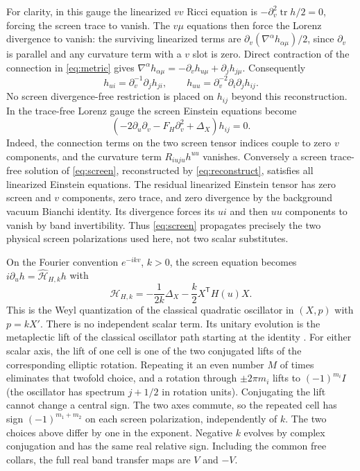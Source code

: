 \documentclass[11pt]{article}
\begin{document}
For clarity, in this gauge the linearized $vv$ Ricci equation is $-\partial_v^2 \operatorname{tr}h/2=0$, forcing the screen trace to vanish. The $v\mu$ equations then force the Lorenz divergence to vanish: the surviving linearized terms are $\partial_v(\nabla^\alpha h_{\alpha\mu})/2$, since $\partial_v$ is parallel and any curvature term with a $v$ slot is zero. Direct contraction of the connection in \eqref{eq:metric} gives
$\nabla^\alpha h_{\alpha\mu}=-\partial_v h_{u\mu}+\partial_jh_{j\mu}$.
Consequently
\begin{equation}
 h_{ui}=\partial_v^{-1}\partial_j h_{ji},\qquad
 h_{uu}=\partial_v^{-2}\partial_i\partial_j h_{ij}.
 \label{eq:reconstruct}
\end{equation}
No screen divergence-free restriction is placed on $h_{ij}$ beyond this reconstruction. In the trace-free Lorenz gauge the screen Einstein equations become
\begin{equation}
 (-2\partial_u\partial_v-F_H\partial_v^2+\Delta_X)h_{ij}=0.
 \label{eq:screen}
\end{equation}
Indeed, the connection terms on the two screen tensor indices couple to zero $v$ components, and the curvature term $R_{iuju}h^{uu}$ vanishes. Conversely a screen trace-free solution of \eqref{eq:screen}, reconstructed by \eqref{eq:reconstruct}, satisfies all linearized Einstein equations. The residual linearized Einstein tensor has zero screen and $v$ components, zero trace, and zero divergence by the background vacuum Bianchi identity. Its divergence forces its $ui$ and then $uu$ components to vanish by band invertibility. Thus \eqref{eq:screen} propagates precisely the two physical screen polarizations used here, not two scalar substitutes.

On the Fourier convention $e^{-ikv}$, $k>0$, the screen equation becomes $i\partial_u h=\widehat{\mathcal H}_{H,k}h$ with
\[
 \widehat{\mathcal H}_{H,k}
  =-\frac{1}{2k}\Delta_X-\frac{k}{2}X^\mathsf{T}H(u)X .
\]
This is the Weyl quantization of the classical quadratic oscillator in $(X,p)$ with $p=kX'$. There is no independent scalar term. Its unitary evolution is the metaplectic lift of the classical oscillator path starting at the identity \cite{littlejohn}. For either scalar axis, the lift of one cell is one of the two conjugated lifts of the corresponding elliptic rotation. Repeating it an even number $M$ of times eliminates that twofold choice, and a rotation through $\pm2\pi m_i$ lifts to $(-1)^{m_i}I$ (the oscillator has spectrum $j+1/2$ in rotation units). Conjugating the lift cannot change a central sign. The two axes commute, so the repeated cell has sign $(-1)^{m_1+m_2}$ on each screen polarization, independently of $k$. The two choices above differ by one in the exponent. Negative $k$ evolves by complex conjugation and has the same real relative sign. Including the common free collars, the full real band transfer maps are $V$ and $-V$.
\end{document}
